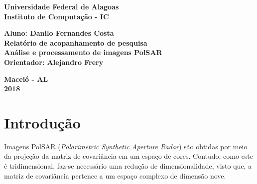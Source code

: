 \documentclass[12pt]{article}
\begin{document}
\begin{titlepage}
\begin{center}

\textbf{\LARGE Universidade Federal de Alagoas } \\[0.5cm]
\textbf{\large Instituto de Computação - IC}\\[0.2cm]

\vspace{20pt}

\vspace{20pt}
\vspace{20pt}
\vspace{20pt}
\vspace{20pt}
\vspace{20pt}
\vspace{20pt}
\vspace{20pt}
\vspace{20pt}

\textbf{\Large Aluno: Danilo Fernandes Costa}\\
\vspace{70pt}
\textbf{\LARGE Relatório de acopanhamento de pesquisa}\\
\vspace{20pt}
\textbf{\Large Análise e processamento de imagens PolSAR}\\
\vspace{70pt}
\textbf{\large Orientador: Alejandro Frery}\\

\vspace{45pt}
\end{center}

\par
\vfill
\begin{center}
\textbf{Maceió - AL}\\
\textbf{2018}
\end{center}

\end{titlepage}

\newpage

\section{Introdução}

Imagens PolSAR (\textit{Polarimetric Synthetic Aperture Radar}) são obtidas por meio da projeção da matriz de covariância em um espaço de cores. Contudo, como este é tridimensional, faz-se necessário uma redução de dimensionalidade, visto que, a matriz de covariância pertence a um espaço complexo de dimensão nove.
\end{document}

